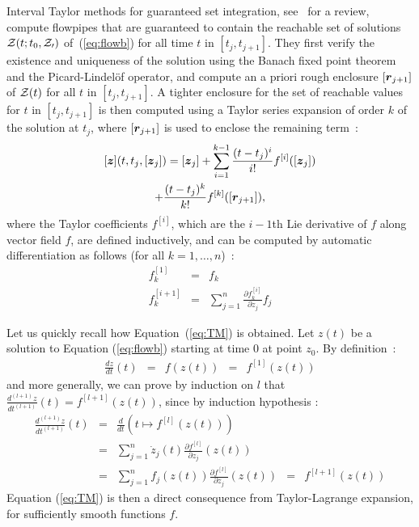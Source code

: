 \documentclass{sig-alternate-05-2015}
\begin{document}
Interval Taylor methods for guaranteed set integration, see~\cite{Nedialkov99} for a review, compute flowpipes that are guaranteed
 to contain the reachable set of solutions 
${\cal Z}(t;t_0, {\cal Z_0})$ of~(\ref{eq:flowb}) for all time $t$ in $[t_j,t_{j+1}]$. They first verify the existence and uniqueness of 
the solution using the Banach fixed point theorem and the Picard-Lindel\"of operator, and compute an a priori rough enclosure $[{\r}_{j+1}]$ of 
   ${\cal Z}(t)$ for all $t$ in $[t_j,t_{j+1}]$. A tighter enclosure for the set of reachable values for $t$ in $[t_j,t_{j+1}]$ is then computed 
using a Taylor series expansion of order $k$ of the solution at $t_j$, where $[{\r}_{j+1}]$ is used to enclose the remaining term~: 
\begin{multline} 
[\z](t,t_j,[{\z}_j]) =  [{\z}_j] + \sum\limits_{i=1}^{k-1} \frac{(t-t_j)^i}{i !} f^{[i]}([{\z}_j])\\
 + \frac{(t-t_j)^k}{k !} f^{[k]}([{\r}_{j+1}]),
\label{eq:TM}
\end{multline}
where the Taylor coefficients $f^{[i]}$, which are the $i-1$th Lie derivative of $f$ along
vector field $f$, are defined inductively, and 
can be computed by automatic differentiation as follows (for all $k=1,\ldots,n$)~: 
\begin{eqnarray}
f^{[1]}_k & = & f_k \\
f^{[i+1]}_k & = & \sum\limits_{j=1}^n \frac{\partial{f^{[i]}_k}}{\partial z_j} f_j
\label{Lie1}
\end{eqnarray}

Let us quickly recall how Equation~(\ref{eq:TM}) is obtained. Let $z(t)$ be a solution to Equation (\ref{eq:flowb}) starting at
time 0 at point $z_0$. By definition~: 
$$
\begin{array}{rclcl}
\frac{d z}{d t}(t) & = & f(z(t)) & = & f^{[1]}(z(t))
\end{array}$$
\noindent and more generally, we can prove by induction on $l$ that 
$\frac{d^{(l+1)} z}{dt^{(l+1)}}(t) = f^{[l+1]}(z(t))$, 
since by induction hypothesis :
$$\begin{array}{rclcl}
\frac{d^{(l+1)} z}{dt^{(l+1)}}(t) & = & \frac{d}{dt}\left(t \mapsto
f^{[l]}(z(t))\right) \\
& = & \sum\limits_{j=1}^n \dot{z}_j(t) \frac{\partial f^{[l]}}{\partial z_j}(z(t)) \\
& = & \sum\limits_{j=1}^n f_j(z(t)) \frac{\partial f^{[l]}}{\partial z_j}(z(t)) 
& = & f^{[l+1]}(z(t))
\end{array}$$
Equation (\ref{eq:TM}) is then a direct consequence from Taylor-La\-grange expansion, for sufficiently smooth functions $f$. \\
\end{document}
